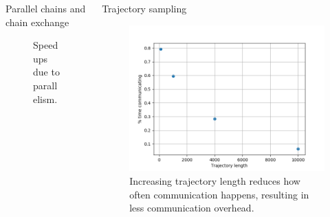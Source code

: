 \documentclass[final]{beamer}
\newlength{\onecolwid}
\newlength{\twocolwid}
\begin{document}
\begin{frame}[t]
\begin{columns}[t]
\begin{column}{\twocolwid}
\begin{columns}[t,totalwidth=\twocolwid]
\begin{column}{\onecolwid}
\begin{block}{Parallel chains and chain exchange}
\begin{figure}
    \caption{Speedups due to parallelism.}
    \label{fig:speedup-partitioning}
  \end{figure}

\end{block}


\end{column} %

\begin{column}{\onecolwid}\vspace{-.6in} %


\begin{block}{Trajectory sampling}
  \begin{figure}
    \includegraphics[width=0.7\linewidth]{poster-figures/traj_length_slowdown.png}
    \caption{Increasing trajectory length reduces how often communication happens, resulting in less
      communication overhead.}
    \label{fig:less-comm}
  \end{figure}
\end{block}
\vspace{-2cm}


\end{column}
\end{columns}
\end{column}
\end{columns}
\end{frame}
\end{document}
